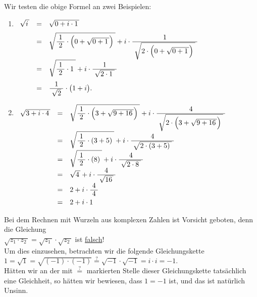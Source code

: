 \examples
Wir testen die obige Formel  an zwei Beispielen:
\begin{enumerate}
\item $
       \begin{array}[t]{lcl}
       \sqrt{i\,} & = & \sqrt{0 + i \cdot 1\,} \\[0.2cm]
                  & = & \sqrt{\bruch{1}{2} \cdot \Bigl(0 + \sqrt{0 + 1\,}\Bigr)\;} + 
                         i \cdot \bruch{1}{\sqrt{2\cdot \Bigl(0 + \sqrt{0 + 1\,}\Bigr)\;}}    \\[0.2cm]
                  & = & \sqrt{\bruch{1}{2} \cdot 1\;} + i \cdot \bruch{1}{\sqrt{2\cdot 1\;}} \\[0.4cm]
                  & = & \bruch{1}{\sqrt{2}} \cdot \bigl(1 + i\bigr).
       \end{array}
       $
\item $
       \begin{array}[t]{lcl}
             \sqrt{3 + i \cdot 4\,}
       & = & \sqrt{\bruch{1}{2} \cdot \Bigl(3 + \sqrt{9 + 16\,}\Bigr)\;} + 
             i \cdot \bruch{4}{\sqrt{2\cdot \Bigl(3 + \sqrt{9 + 16\,}\Bigr)\;}}    \\[0.2cm]
       & = & \sqrt{\bruch{1}{2} \cdot (3 + 5)\;} + i \cdot \bruch{4}{\sqrt{2\cdot (3 + 5)\;}}     \\[0.2cm]
       & = & \sqrt{\bruch{1}{2} \cdot (8)\;} + i \cdot \bruch{4}{\sqrt{2\cdot 8\;}}     \\[0.2cm]
       & = & \sqrt{4\,} + i \cdot \bruch{4}{\sqrt{16\,}}     \\[0.2cm]
       & = & 2 + i \cdot \bruch{4}{4}     \\[0.2cm]
       & = & 2 + i \cdot 1
       \end{array}
       $
\end{enumerate}

\remark
Bei dem Rechnen mit Wurzeln aus komplexen Zahlen ist Vorsicht geboten, denn die Gleichung 
\\[0.2cm]
\hspace*{1.3cm}
$\sqrt{z_1 \cdot z_2\,} = \sqrt{z_1\,} \cdot \sqrt{z_2\,}$  \quad ist \underline{falsch}!
\\[0.2cm]
Um dies einzusehen, betrachten wir die folgende Gleichungskette
\\[0.2cm]
\hspace*{1.3cm}
$1 = \sqrt{1} = \sqrt{(-1) \cdot (-1)} \stackrel{?}{=} \sqrt{-1} \cdot \sqrt{-1} = i \cdot i = -1$.
\\[0.2cm]
H\"{a}tten wir an der mit $\stackrel{?}{=}$ markierten Stelle dieser Gleichungskette tats\"{a}chlich eine
Gleichheit, so h\"{a}tten wir bewiesen, dass $1 = -1$ ist, und das ist nat\"{u}rlich Unsinn.

